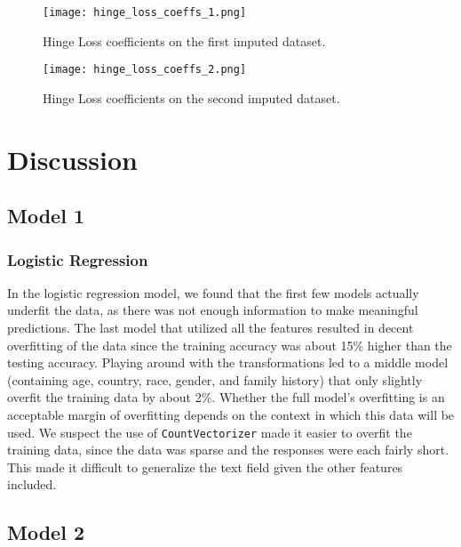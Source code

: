 \documentclass[times, twocolumn]{article}
\begin{document}
\begin{figure}
    \centering
    \texttt{[image: hinge\_loss\_coeffs\_1.png]}
    \caption{Hinge Loss coefficients on the first imputed dataset.}
    \label{fig:hinge_loss_coeffs_1}
\end{figure}

\begin{figure}
    \centering
    \texttt{[image: hinge\_loss\_coeffs\_2.png]}
    \caption{Hinge Loss coefficients on the second imputed dataset.}
    \label{fig:hinge_loss_coeffs_2}
\end{figure}

\section{Discussion}

\subsection{Model 1}
\subsubsection{Logistic Regression}

In the logistic regression model, we found that the first few models actually
underfit the data, as there was not enough information to make meaningful predictions.
The last model that utilized all the features resulted in decent overfitting of the
data since the training accuracy was about 15\% higher than the testing accuracy.
Playing around with the transformations led to a middle model (containing age,
country, race, gender, and family history) that only slightly overfit the training
data by about 2\%. Whether the full model’s overfitting is an acceptable margin of
overfitting depends on the context in which this data will be used. We suspect the
use of \texttt{CountVectorizer} made it easier to overfit the training data,
since the data was sparse and the responses were each fairly short. This made it
difficult to generalize the text field given the other features included.

\subsection{Model 2}
\end{document}
